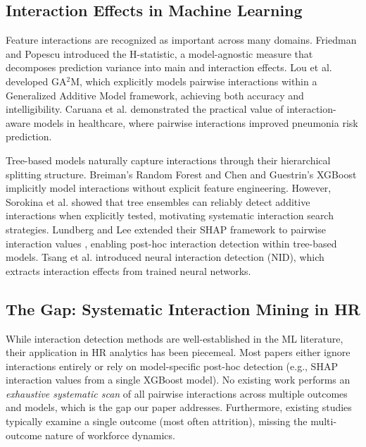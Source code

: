 \documentclass[twocolumn]{article}
\begin{document}
\subsection{Interaction Effects in Machine Learning}

Feature interactions are recognized as important across many domains. Friedman and Popescu \cite{friedman2008predictive} introduced the H-statistic, a model-agnostic measure that decomposes prediction variance into main and interaction effects. Lou et al. \cite{lou2013accurate} developed GA$^2$M, which explicitly models pairwise interactions within a Generalized Additive Model framework, achieving both accuracy and intelligibility. Caruana et al. \cite{caruana2015intelligible} demonstrated the practical value of interaction-aware models in healthcare, where pairwise interactions improved pneumonia risk prediction.

Tree-based models naturally capture interactions through their hierarchical splitting structure. Breiman's Random Forest \cite{breiman2001random} and Chen and Guestrin's XGBoost \cite{chen2016xgboost} implicitly model interactions without explicit feature engineering. However, Sorokina et al. \cite{sorokina2008detecting} showed that tree ensembles can reliably detect additive interactions when explicitly tested, motivating systematic interaction search strategies. Lundberg and Lee \cite{lundberg2017unified} extended their SHAP framework to pairwise interaction values \cite{lundberg2020shap}, enabling post-hoc interaction detection within tree-based models. Tsang et al. \cite{tsang2018detecting} introduced neural interaction detection (NID), which extracts interaction effects from trained neural networks.

\subsection{The Gap: Systematic Interaction Mining in HR}

While interaction detection methods are well-established in the ML literature, their application in HR analytics has been piecemeal. Most papers either ignore interactions entirely or rely on model-specific post-hoc detection (e.g., SHAP interaction values from a single XGBoost model). No existing work performs an \textit{exhaustive systematic scan} of all pairwise interactions across multiple outcomes and models, which is the gap our paper addresses. Furthermore, existing studies typically examine a single outcome (most often attrition), missing the multi-outcome nature of workforce dynamics.
\end{document}
